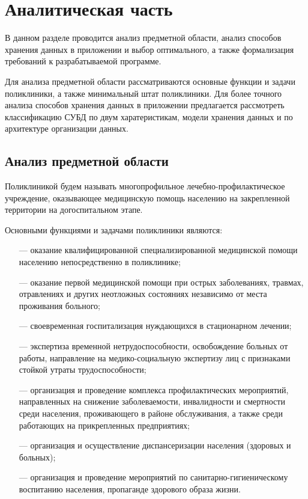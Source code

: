 \section{\large Аналитическая часть}

В данном разделе проводится анализ предметной области, анализ способов хранения данных в приложении и выбор оптимального, а также формализация требований к разрабатываемой программе.

Для анализа предметной области рассматриваются основные функции и задачи поликлиники, а также минимальный штат поликлиники. Для более точного анализа способов хранения данных в приложении предлагается рассмотреть классификацию СУБД по двум харатеристикам, модели хранения данных и по архитектуре организации данных.

\subsection{Анализ предметной области}

Поликлиникой будем называть многопрофильное лечебно-\linebreak профилактическое учреждение, оказывающее медицинскую помощь населению на закрепленной территории на догоспитальном этапе.

Основными функциями и задачами поликлиники являются:

\begin{itemize}[leftmargin=1.6\parindent]
	\item[---] оказание квалифицированной специализированной медицинской помощи населению непосредственно в поликлинике;
	\item[---] оказание первой медицинской помощи при острых заболеваниях, травмах, отравлениях и других неотложных состояниях независимо от места проживания больного;
	\item[---] своевременная госпитализация нуждающихся в стационарном лечении;
	\item[---] экспертиза временной нетрудоспособности, освобождение больных от работы, направление на медико-социальную экспертизу лиц с признаками стойкой утраты трудоспособности;
	\item[---] организация и проведение комплекса профилактических мероприятий, направленных на снижение заболеваемости, инвалидности и смертности среди населения, проживающего в районе обслуживания, а также среди работающих на прикрепленных предприятиях;
	\item[---] организация и осуществление диспансеризации населения (здоровых и больных);
	\item[---] организация и проведение мероприятий по санитарно-гигиеническому воспитанию населения, пропаганде здорового образа жизни.
\end{itemize}

